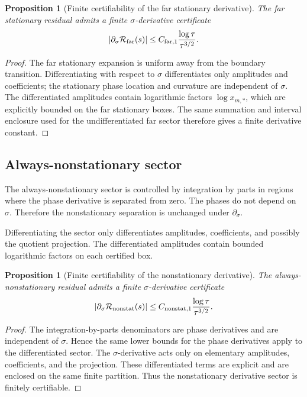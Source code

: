 \documentclass[11pt]{article}
\newtheorem{proposition}[theorem]{Proposition}
\begin{document}
\begin{proposition}[Finite certifiability of the far stationary derivative]
\label{prop:far-derivative-certifiable}
The far stationary residual admits a finite \(\sigma\)-derivative certificate
\[
        |\partial_\sigma\mathcal R_{\rm far}(s)|
        \le
        C_{{\rm far},1}
        \frac{\log\tau}{\tau^{3/2}}.
\]
\end{proposition}

\begin{proof}
The far stationary expansion is uniform away from the boundary transition.
Differentiating with respect to \(\sigma\) differentiates only amplitudes and
coefficients; the stationary phase location and curvature are independent of
\(\sigma\).  The differentiated amplitudes contain logarithmic factors
\(\log x_{m,*}\), which are explicitly bounded on the far stationary boxes.
The same summation and interval enclosure used for the undifferentiated far
sector therefore gives a finite derivative constant.
\end{proof}

\subsection{Always-nonstationary sector}

The always-nonstationary sector is controlled by integration by parts in
regions where the phase derivative is separated from zero.  The phases do not
depend on \(\sigma\).  Therefore the nonstationary separation is unchanged
under \(\partial_\sigma\).

Differentiating the sector only differentiates amplitudes, coefficients, and
possibly the quotient projection.  The differentiated amplitudes contain
bounded logarithmic factors on each certified box.

\begin{proposition}[Finite certifiability of the nonstationary derivative]
\label{prop:nonstat-derivative-certifiable}
The always-nonstationary residual admits a finite \(\sigma\)-derivative
certificate
\[
        |\partial_\sigma\mathcal R_{\rm nonstat}(s)|
        \le
        C_{{\rm nonstat},1}
        \frac{\log\tau}{\tau^{3/2}}.
\]
\end{proposition}

\begin{proof}
The integration-by-parts denominators are phase derivatives and are independent
of \(\sigma\).  Hence the same lower bounds for the phase derivatives apply to
the differentiated sector.  The \(\sigma\)-derivative acts only on elementary
amplitudes, coefficients, and the projection.  These differentiated terms are
explicit and are enclosed on the same finite partition.  Thus the
nonstationary derivative sector is finitely certifiable.
\end{proof}
\end{document}
